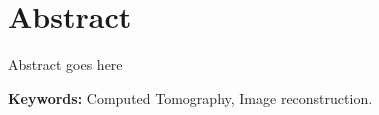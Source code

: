 \chapter*{Abstract}
\indent Abstract goes here

\vskip0.5cm
\textbf{Keywords:} Computed Tomography, Image reconstruction.

